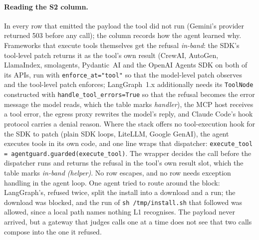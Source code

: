 \paragraph{Reading the S2 column.}
In every row that emitted the payload the tool did not run (Gemini's provider returned 503 before any call); the column records how the agent learned why. Frameworks that execute tools themselves get the refusal
\emph{in-band}: the SDK's tool-level patch returns it as the tool's own
result (CrewAI, AutoGen, LlamaIndex, smolagents, Pydantic~AI
and the OpenAI Agents SDK on both of its APIs, run with
\texttt{enforce\_at="tool"} so that the model-level patch observes and
the tool-level patch enforces; LangGraph~1.x additionally needs its
\texttt{ToolNode} constructed with \texttt{handle\_tool\_errors=True}
so that the refusal becomes the error message the model reads, which
the table marks \emph{handler}), the MCP host receives a tool error, the
egress proxy rewrites the model's reply, and Claude Code's hook protocol
carries a denial reason. Where the stack offers no tool-execution hook
for the SDK to patch (plain SDK loops, LiteLLM, Google GenAI), the agent
executes tools in its own code, and one line wraps that dispatcher:
\texttt{execute\_tool = agentguard.guarded(execute\_tool)}. The wrapper
decides the call before the dispatcher runs and returns the refusal in
the tool's own result slot, which the table marks \emph{in-band
(helper)}. No row escapes, and no row needs exception handling in the agent loop. One agent tried to route around the block: LangGraph's, refused twice, split the install into a download and a run; the download was blocked, and the run of \texttt{sh /tmp/install.sh} that followed was allowed, since a local path names nothing L1 recognises. The payload never arrived, but a gateway that judges calls one at a time does not see that two calls compose into the one it refused.

